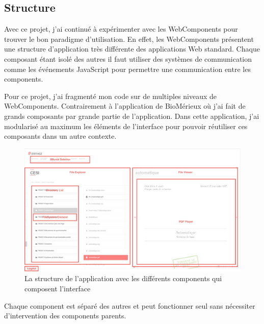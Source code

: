 \subsection{Structure}

Avec ce projet, j'ai continué à expérimenter avec les WebComponents pour trouver le bon paradigme d'utilisation.
En effet, les WebComponents présentent une structure d'application très différente des applications Web standard.
Chaque composant étant isolé des autres il faut utiliser des systèmes de communication comme les événements JavaScript pour permettre une communication entre les components.

Pour ce projet, j'ai fragmenté mon code sur de multiples niveaux de WebComponents.
Contrairement à l'application de BioMérieux où j'ai fait de grands composants par grande partie de l'application.
Dans cette application, j'ai modularisé au maximum les éléments de l'interface pour pouvoir réutiliser ces composants dans un autre contexte.

\begin{figure}[h]
    \centering
    \includegraphics[scale=0.5]{img/media-reader-structure.pdf}
    \caption{La structure de l'application avec les différents components qui composent l'interface}
\end{figure}

Chaque component est séparé des autres et peut fonctionner seul sans nécessiter d'intervention des components parents.

